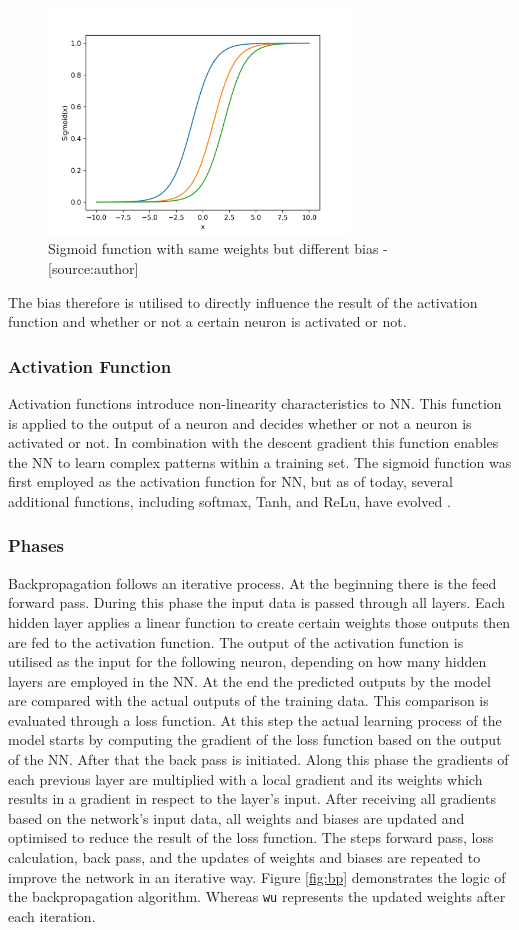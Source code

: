 \begin{figure}[H]
	\centering
		\includegraphics[width=8cm]{images/bias}
	\caption{Sigmoid function with same weights but different bias - [source:author]}
	\label{fig:sig_w_bias}
\end{figure}
The bias therefore is utilised to directly influence the result of the activation function and whether or not a certain neuron is activated or not. 
\subsubsection{Activation Function}
Activation functions introduce non-linearity characteristics to NN. This function is applied to the output of a neuron and decides whether or not a neuron is activated or not.\cite{activation} In combination with the descent gradient this function enables the NN to learn complex patterns within a training set.
The sigmoid function \cite{bp_basic} was first employed as the activation function for NN, but as of today, several additional functions, including softmax, Tanh, and ReLu, have evolved \cite{activation}.

\subsubsection{Phases} 
Backpropagation follows an iterative process. At the beginning there is the feed forward pass. During this phase the input data is passed through all layers. Each hidden layer applies a linear function to create certain weights those outputs then are fed to the activation function. The output of the activation function is utilised as the input for the following neuron, depending on how many hidden layers are employed in the NN. At the end the predicted outputs by the model are compared with the actual outputs of the training data. This comparison is evaluated through a loss function. At this step the actual learning process of the model starts by computing the gradient of the loss function based on the output of the NN. After that the back pass is initiated. Along this phase the gradients of each previous layer are multiplied with a local gradient and its weights which results in a gradient in respect to the layer's input. After receiving all gradients  based on the network's input data, all weights and biases are updated and optimised to reduce the result of the loss function. The steps forward pass, loss calculation, back pass, and the updates of weights and biases are repeated to improve the network in an iterative way. \cite{bp_basic} Figure \ref{fig:bp} demonstrates the logic of the backpropagation algorithm. Whereas \verb|wu| represents the updated weights after each iteration.  

